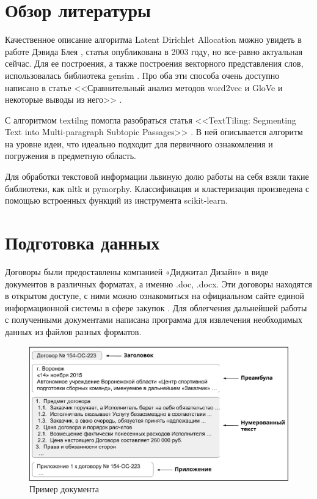 \documentclass[12pt]{article}
\begin{document}
\newpage
\section{Обзор литературы}
Качественное описание алгоритма Latent Dirichlet Allocation можно увидеть в работе Дэвида Блея \cite{lda}, статья опубликована в 2003 году, но все-равно актуальная сейчас. Для ее построения, а также построения векторного представления слов, использовалась библиотека gensim \cite{gensim}. Про оба эти способа очень доступно написано в статье <<Сравнительный анализ методов word2vec и GloVe и некоторые выводы из него>> \cite{maslovskaya}.

С алгоритмом textilng помогла разобраться статья <<TextTiling: \linebreak Segmenting Text into Multi-paragraph Subtopic Passages>> \cite{texttiling}. В ней описывается алгоритм на уровне идеи, что идеально подходит для первичного ознакомления и погружения в предметную область. 

Для обработки текстовой информации львиную долю работы на себя взяли такие библиотеки, как nltk и pymorphy. Классификация и кластеризация произведена с помощью встроенных функций из инструмента scikit-learn.


\newpage
\section{Подготовка данных}
Договоры были предоставлены компанией «Диджитал Дизайн» \cite{dd} в виде документов в различных форматах, а именно .doc, .docx. Эти договоры находятся в открытом доступе, с ними можно ознакомиться на официальном сайте единой информационной системы в сфере закупок \cite{zakupki}. Для облегчения дальнейшей работы с полученными документами написана программа для извлечения необходимых данных из файлов разных форматов. 

\vspace{5pt}
\begin{figure}[h]
	\includegraphics[scale=0.74]{images/im1.eps}
	\caption{Пример документа}
	\label{im1}
\end{figure}
\vspace{5pt}
\end{document}

